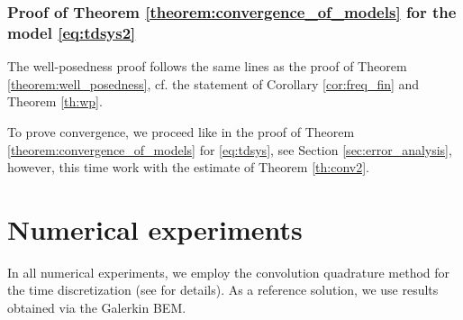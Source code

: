 \documentclass[]{article}
\numberwithin{equation}{section}
\numberwithin{theorem}{section}
\numberwithin{lemma}{section}
\numberwithin{corollary}{section}
\numberwithin{proposition}{section}
\numberwithin{definition}{section}
\begin{document}
	\subsubsection{Proof of Theorem \ref{theorem:convergence_of_models} for the model \eqref{eq:tdsys2}}
	\label{sec:convmod}
	The well-posedness proof follows the same lines as the proof of Theorem \ref{theorem:well_posedness}, cf. the statement of Corollary \ref{cor:freq_fin} and Theorem \ref{th:wp}. 
	
	To prove convergence, we proceed like in the proof of Theorem \ref{theorem:convergence_of_models} for \eqref{eq:tdsys}, see Section \ref{sec:error_analysis}, however, this time work with the estimate of Theorem \ref{th:conv2}. 
	
	
	
	\section{Numerical experiments}
	\label{sec:numerical_experiments}
	In all numerical experiments, we employ the convolution quadrature method for the time discretization (see \cite{lubich88_1, lubich88_2, lubich94} for details). As a reference solution, we use results obtained via the Galerkin BEM.
\end{document}

